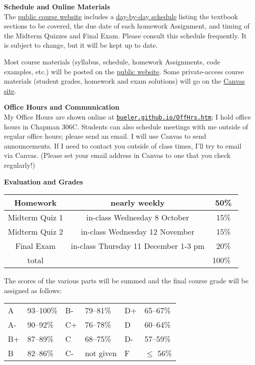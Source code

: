 \documentclass[12pt]{article}
\renewcommand{\emph}[1]{\textsf{\textbf{#1}}}
\newcommand{\localhead}[1]{\par\smallskip\textbf{#1} \smallskip\nobreak\\}%
\def\heading#1{\localhead{\large\emph{#1}}}
\begin{document}
\heading{Schedule and Online Materials}
The \href{https://bueler.github.io/nla/}{public course website} includes a \href{https://bueler.github.io/nla/assets/general/F25/schedule.pdf}{day-by-day schedule} listing the textbook sections to be covered, the due date of each homework Assignment, and timing of the Midterm Quizzes and Final Exam.  Please consult this schedule frequently.  It is subject to change, but it will be kept up to date.

Most course materials (syllabus, schedule, homework Assignments, code examples, etc.) will be posted on the \href{https://bueler.github.io/nla/}{public website}.  Some private-access course materials (student grades, homework and exam solutions) will go on the \href{https://canvas.alaska.edu/courses/27130}{Canvas site}.


\heading{Office Hours and Communication}
My Office Hours are shown online at \href{http://bueler.github.io/OffHrs.htm}{\texttt{bueler.github.io/OffHrs.htm}}; I hold office hours in Chapman 306C.  Students can also schedule meetings with me outside of regular office hours; please send an email.  I will use Canvas to send announcements.  If I need to contact you outside of class times, I'll try to email via Canvas.  (Please set your email address in Canvas to one that you check regularly!)


\phantom{foo}
\heading{Evaluation and Grades}
\vskip -10pt

\begin{tabular}{|c|c|c|}
\hline
Homework & nearly weekly & 50\% \\
\hline
Midterm Quiz 1 & in-class Wednesday 8 October  & 15\%  \\
\hline
Midterm Quiz 2 & in-class Wednesday 12 November & 15\%  \\
\hline
Final Exam     & in-class Thursday 11 December 1-3 pm & 20\% \\
\hline
total & & 100\% \, \\
\hline
\end{tabular}

The scores of the various parts will be summed and the final course grade will be assigned as follows:

\begin{tabular}{llllll}
A  & 93--100\% & B- & 79--81\%  & D+ & 65--67\%  \\
A- & 90--92\%  & C+ & 76--78\%  & D  & 60--64\%  \\
B+ & 87--89\%  & C  & 68--75\%  & D- & 57--59\%  \\
B  & 82--86\%  & C- & not given & F  & $\le$ 56\%
\end{tabular}
\end{document}
